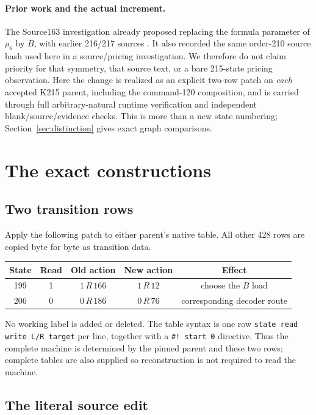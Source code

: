\documentclass[11pt,a4paper]{article}
\theoremstyle{remark}\newtheorem{remark}[theorem]{Remark}
\begin{document}
\paragraph{Prior work and the actual increment.}
The Source163 investigation already proposed replacing the formula parameter
of $\rho_6$ by $B$, with earlier 216/217 sources
\cite{rho6prior,intake199}. It also recorded the same order-210 source hash
used here in a source/pricing investigation. We therefore do not claim
priority for that symmetry, that source text, or a bare 215-state pricing
observation. Here the change is realized as an explicit two-row patch on
\emph{each} accepted K215 parent, including the command-120 composition,
and is carried through full arbitrary-natural runtime verification and
independent blank/source/evidence checks. This is more than a new state
numbering; Section~\ref{sec:distinction} gives exact graph comparisons.

\section{The exact constructions}

\subsection{Two transition rows}

Apply the following patch to either parent's native table. All other 428 rows
are copied byte for byte as transition data.
\begin{center}
\begin{tabular}{@{}ccccc@{}}
\toprule
State & Read & Old action & New action & Effect\\
\midrule
199 & 1 & $1\,R\,166$ & $1\,R\,12$ & choose the $B$ load\\
206 & 0 & $0\,R\,186$ & $0\,R\,76$ & corresponding decoder route\\
\bottomrule
\end{tabular}
\end{center}
No working label is added or deleted. The table syntax is one row
\texttt{state read write L/R target} per line, together with a
\texttt{\#! start 0} directive. Thus the complete machine is determined
by the pinned parent and these two rows; complete tables are also supplied
so reconstruction is not required to read the machine.

\subsection{The literal source edit}
\end{document}
